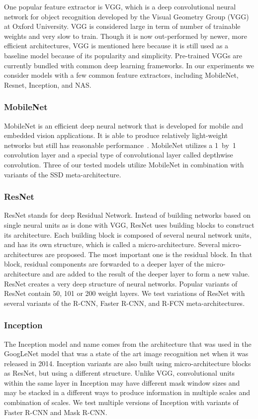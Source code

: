 \documentclass[conference]{IEEEtran}
\begin{document}
One popular feature extractor is VGG, which is a deep convolutional neural network for object recognition developed by the Visual Geometry Group (VGG) at Oxford University.
VGG is considered large in term of number of trainable weights and very slow to train. 
Though it is now out-performed by newer, more efficient architectures, VGG is mentioned here because it is  still used as a baseline model because of its popularity and simplicity.
Pre-trained VGGs are currently bundled with common deep learning frameworks.
In our experiments we consider models with a few common feature extractors, including MobileNet, Resnet, Inception, and NAS.

\subsubsection{MobileNet}
MobileNet is an efficient deep neural network that is developed for  mobile and embedded vision applications.
It is able to produce relatively light-weight networks but still has reasonable performance~\cite{howard2017mobilenets}. 
MobileNet utilizes a 1~by~1 convolution layer and a special type of convolutional layer called depthwise convolution.
Three of our tested models utilize MobileNet in combination with variants of the SSD meta-architecture.

\subsubsection{ResNet}
ResNet stands for deep Residual Network.  Instead of building networks based on single neural units as is done with VGG, ResNet uses building blocks to construct its architecture. 
Each building block is composed of several neural network units, and has its own structure, which is called a micro-architecture. 
Several micro-architectures are proposed.  The most important one is the residual block. 
In that block, residual components are forwarded to a deeper layer of the micro-architecture and are added to the result of the deeper layer to form a new value. 
ResNet creates a very deep structure of neural networks. 
Popular variants of ResNet contain 50, 101 or 200 weight layers.
We test variations of ResNet with several variants of the R-CNN, Faster R-CNN, and R-FCN meta-architectures.

\subsubsection{Inception}
The Inception model and name comes from the architecture that was used in the GoogLeNet model that was a state of the art image recognition net when it was released in 2014.
Inception variants are also built using micro-architecture blocks as ResNet, but using a different structure. 
Unlike VGG, convolutional units within the same layer in Inception may have different mask window sizes and may be stacked in a different ways to produce information in multiple scales and combination of scales.  
We test multiple versions of Inception with variants of Faster R-CNN and Mask R-CNN.
\end{document}
